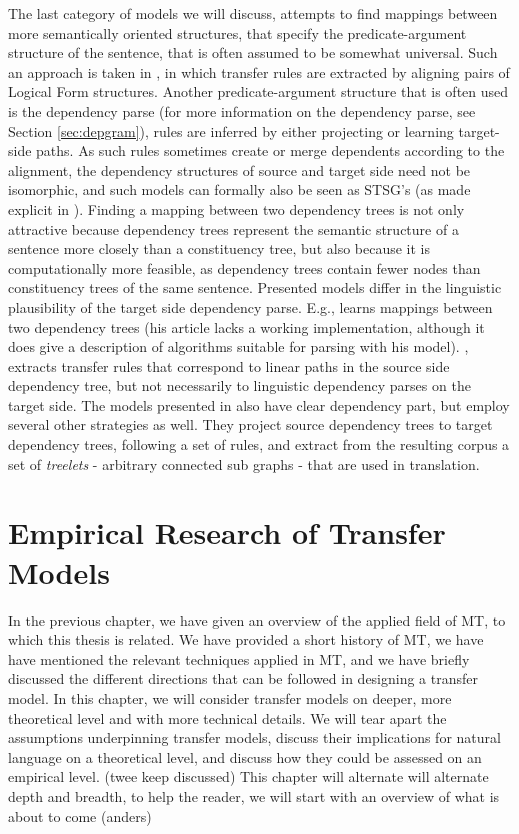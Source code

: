 \documentclass{report}
\theoremstyle{definition}
\theoremstyle{plain}
\begin{document}
The last category of models we will discuss, attempts to find mappings between more semantically oriented structures, that specify the predicate-argument structure of the sentence, that is often assumed to be somewhat universal. Such an approach is taken in \cite{menezes2003best}, in which transfer rules are extracted by aligning pairs of Logical Form structures. Another predicate-argument structure that is often used is the dependency parse (for more information on the dependency parse, see Section \ref{sec:depgram}), rules are inferred by either projecting or learning target-side paths. As such rules sometimes create or merge dependents according to the alignment, the dependency structures of source and target side need not be isomorphic, and such models can formally also be seen as STSG's (as made explicit in \cite{eisner2003learning}). Finding a mapping between two dependency trees is not only attractive because dependency trees represent the semantic structure of a sentence more closely than a constituency tree, but also because it is computationally more feasible, as dependency trees contain fewer nodes than constituency trees of the same sentence. Presented models differ in the linguistic plausibility of the target side dependency parse. E.g., \cite{eisner2003learning} learns mappings between two dependency trees (his article lacks a working implementation, although it does give a description of algorithms suitable for parsing with his model). \cite{lin2004path}, extracts transfer rules that correspond to linear paths in the source side dependency tree, but not necessarily to linguistic dependency parses on the target side. The models presented in \cite{quirk2005dependency,quirk2006dependency,quirk2006we} also have clear dependency part, but employ several other strategies as well. They project source dependency trees to target dependency trees, following a set of rules, and extract from the resulting corpus a set of \textit{treelets} - arbitrary connected sub graphs - that are used in translation.

 
\chapter{Empirical Research of Transfer Models}
\label{ch:empirical} 

In the previous chapter, we have given an overview of the applied field of MT, to which this thesis is related. We have provided a short history of MT, we have have mentioned the relevant techniques applied in MT, and we have briefly discussed the different directions that can be followed in designing a transfer model. In this chapter, we will consider transfer models on deeper, more theoretical level and with more technical details. We will tear apart the assumptions underpinning transfer models, discuss their implications for natural language on a theoretical level, and discuss how they could be assessed on an empirical level. (twee keep discussed) This chapter will alternate will alternate depth and breadth, to help the reader, we will start with an overview of what is about to come (anders)
\end{document}

